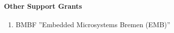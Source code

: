 \paragraph{Other Support Grants}
\begin{enumerate}
\item BMBF ''Embedded Microsystems Bremen (EMB)''
\end{enumerate}


\nocite{Wagner06-1} \nocite{Wagner06-2} \nocite{Wagner06-3}
\nocite{Wagner06-4} \nocite{Wagner06-5} \nocite{Wagner06-6}
